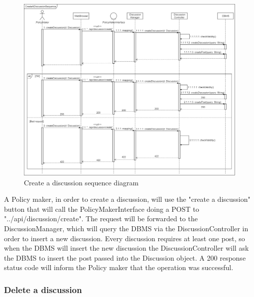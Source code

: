 \begin{figure}[h!]
        \centering
        \includegraphics[scale=0.27]{images/runtime_view/create_discussion_runtime_view_diagram.png}
        \caption{Create a discussion sequence diagram}
        \label{fig:create_a_discussion_sequence_diagram}
\end{figure}
\FloatBarrier

A Policy maker, in order to create a discussion, will use the "create a discussion" button that will call the PolicyMakerInterface doing a POST to "../api/discussion/create". The request will be forwarded to the DiscussionManager, which will query the DBMS via the DiscussionController in order to insert a new discussion. Every discussion requires at least one post, so when the DBMS will insert the new discussion the DiscussionController will ask the DBMS to insert the post passed into the Discussion object. A 200 response status code will inform the Policy maker that the operation was successful.

\newpage
\subsubsection{Delete a discussion}

